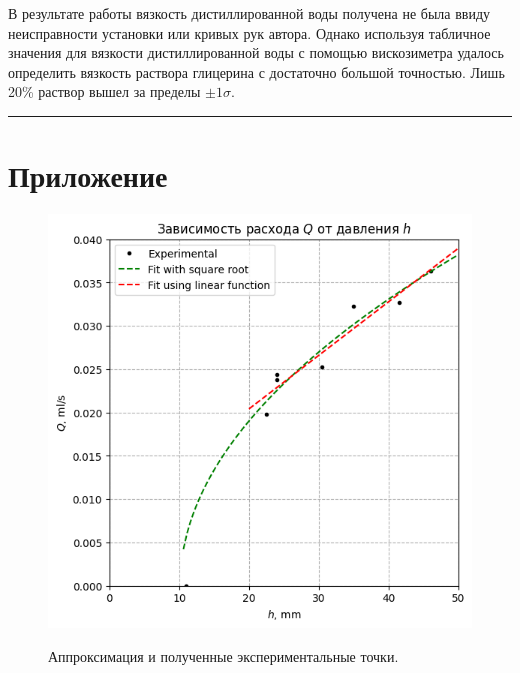 \documentclass[a4paper,12pt]{report}
\begin{document}
    \begin{multicols}{2}
        В результате работы вязкость дистиллированной воды получена не была ввиду неисправности установки или кривых рук автора. Однако используя табличное значения для вязкости дистиллированной воды с помощью вискозиметра удалось определить вязкость раствора глицерина с достаточно большой точностью. Лишь 20\% раствор вышел за пределы $\pm 1 \sigma$.
    \end{multicols}

    \hrule

    \section{Приложение}

    \begin{figure}[H]
        \includegraphics[width=0.75\columnwidth]{../img/output.png}
        \centering
        \label{fig:experimental}
        \caption{Аппроксимация и полученные экспериментальные точки.}
    \end{figure}

    \newpage

\end{document}
